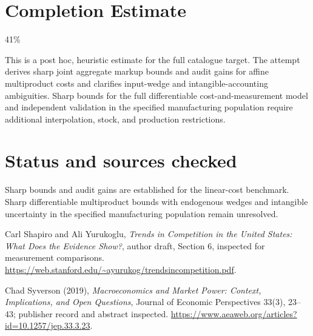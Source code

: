 \documentclass[11pt]{article}
\begin{document}
\section{Completion Estimate}
41\%

This is a post hoc, heuristic estimate for the full catalogue target.
The attempt derives sharp joint aggregate markup bounds and audit gains for affine multiproduct costs and clarifies input-wedge and intangible-accounting ambiguities. Sharp bounds for the full differentiable cost-and-measurement model and independent validation in the specified manufacturing population require additional interpolation, stock, and production restrictions.

\section*{Status and sources checked}
Sharp bounds and audit gains are established for the linear-cost benchmark. Sharp differentiable multiproduct bounds with endogenous wedges and intangible uncertainty in the specified manufacturing population remain unresolved.

Carl Shapiro and Ali Yurukoglu, \emph{Trends in Competition in the United States: What Does the Evidence Show?}, author draft, Section 6, inspected for measurement comparisons. \url{https://web.stanford.edu/~ayurukog/trendsincompetition.pdf}.

Chad Syverson (2019), \emph{Macroeconomics and Market Power: Context, Implications, and Open Questions}, Journal of Economic Perspectives 33(3), 23--43; publisher record and abstract inspected. \url{https://www.aeaweb.org/articles?id=10.1257/jep.33.3.23}.
\end{document}
